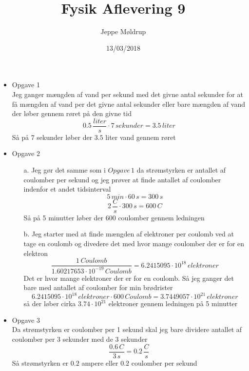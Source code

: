 \documentclass[12pt]{article}
\title{Fysik Aflevering 9}
\author{Jeppe Møldrup}
\date{13/03/2018}
\begin{document}
\maketitle

\begin{itemize}
  \item {Opgave 1}\\
  Jeg ganger mængden af vand per sekund med det givne antal sekunder for at få mængden af vand per det givne antal sekunder eller bare mængden af vand der løber gennem røret på den givne tid\\
  $$
  0.5\, \frac{liter}{s} \cdot 7\, sekunder = 3.5\, liter
  $$
  Så på 7 sekunder løber der $3.5$ liter vand gennem røret\\

  \item {Opgave 2}
  \begin{enumerate}
    \item[a.] Jeg gør det samme som i $Opgave\, 1$ da strømstyrken er antallet af coulomber per sekund og jeg prøver at finde antallet af coulomber indenfor et andet tidsinterval\\
    $$
    5\, min \cdot 60\, s = 300\, s
    $$
    $$
    2\, \frac{C}{s} \cdot 300\, s = 600\, C
    $$
    Så på 5 minutter løber der $600$ coulomber gennem ledningen\\

    \item[b.] Jeg starter med at finde mængden af elektroner per coulomb ved at tage en coulomb og divedere det med hvor mange coulomber der er for en elektron\\
    $$
    \frac{1\, Coulomb}{1.60217653 \cdot 10^{-19}\, Coulomb} = 6.2415095 \cdot 10^{18}\, elektroner
    $$
    Det er hvor mange elektroner der er for en coulomb. Så jeg ganger det bare med antallet af coulomber for min brødrister\\
    $$
    6.2415095 \cdot 10^{18}\, elektroner \cdot 600\, Coulomb = 3.7449057 \cdot 10^{21}\, elektroner
    $$
    så der løber cirka $3.74 \cdot 10^{21}$ elektroner gennem ledningen på 5 minutter\\
  \end{enumerate}

  \item{Opgave 3}\\
  Da strømstyrken er coulomber per 1 sekund skal jeg bare dividere antallet af coulomber per 3 sekunder med de 3 sekunder
  $$
  \frac{0.6\, C}{3\, s} = 0.2\, \frac{C}{s}
  $$
  Så strømstyrken er $0.2$ ampere eller $0.2$ coulomber per sekund\\


\end{itemize}
\end{document}
